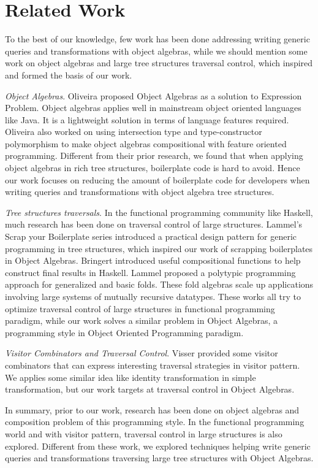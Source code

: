 \section{Related Work}\label{sec:related}

To the best of our knowledge, few work has been done addressing writing generic queries and transformations with object algebras, while we should mention some work on object algebras and large tree structures traversal control, which inspired and formed the basis of our work. 

\textit{Object Algebras}. Oliveira proposed Object Algebras as a solution to Expression Problem. Object algebras applies well in mainstream object oriented languages like Java. It is a lightweight solution in terms of language features required. Oliveira also worked on using intersection type and type-constructor polymorphism to make object algebras compositional with feature oriented programming. Different from their prior research, we found that when applying object algebras in rich tree structures, boilerplate code is hard to avoid. Hence our work focuses on reducing the amount of boilerplate code for developers when writing queries and transformations with object algebra tree structures. 

\textit{Tree structures traversals}. In the functional programming community like Haskell, much research has been done on traversal control of large structures. Lammel's Scrap your Boilerplate\cite{ralf03syb} series introduced a practical design pattern for generic programming in tree structures, which inspired our work of scrapping boilerplates in Object Algebras. Bringert\cite{bjorn08acf} introduced useful compositional functions to help construct final results in Haskell. Lammel\cite{ralf00banana} proposed a polytypic programming approach for generalized and basic folds. These fold algebras scale up applications involving large systems of mutually recursive datatypes. These works all try to optimize traversal control of large structures in functional programming paradigm, while our work solves a similar problem in Object Algebras, a programming style in Object Oriented Programming paradigm. 

\textit{Visitor Combinators and Traversal Control}. Visser\cite{visser01visitor} provided some visitor combinators that can express interesting traversal strategies in visitor pattern. We applies some similar idea like identity transformation in simple transformation, but our work targets at traversal control in Object Algebras. 

In summary, prior to our work, research has been done on object algebras and composition problem of this programming style. In the functional programming world and with visitor pattern, traversal control in large structures is also explored. Different from these work, we explored techniques helping write generic queries and transformations traversing large tree structures with Object Algebras. 

